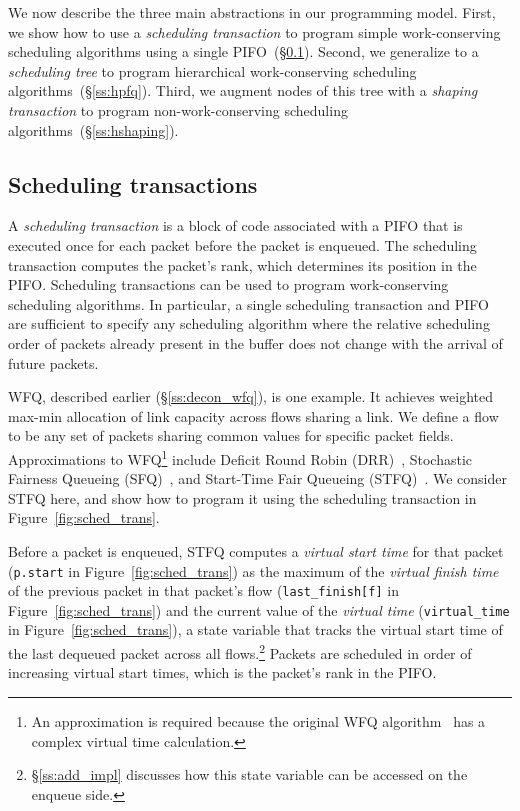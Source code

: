 We now describe the three main abstractions in our programming model. First, we
show how to use a {\em scheduling transaction} to program simple
work-conserving scheduling algorithms using a single PIFO~(\S\ref{ss:wfq}).
Second, we generalize to a {\em scheduling tree} to program hierarchical
work-conserving scheduling algorithms~(\S\ref{ss:hpfq}). Third, we augment
nodes of this tree with a {\em shaping transaction} to program
non-work-conserving scheduling algorithms~(\S\ref{ss:hshaping}).

\subsection{Scheduling transactions}
\label{ss:wfq}

A {\em scheduling transaction} is a block of code associated with a PIFO that
is executed once for each packet before the packet is enqueued. The scheduling
transaction computes the packet's rank, which determines its position in the
PIFO. Scheduling transactions can be used to program work-conserving scheduling
algorithms. In particular, a single scheduling transaction and PIFO are
sufficient to specify any scheduling algorithm where the relative scheduling
order of packets already present in the buffer does not change with the arrival
of future packets.

WFQ, described earlier (\S\ref{ss:decon_wfq}), is one example. It achieves
weighted max-min allocation of link capacity across flows sharing a link. We
define a flow to be any set of packets sharing common values for specific
packet fields.  Approximations to WFQ\footnote{An approximation is required
because the original WFQ algorithm~\cite{wfq} has a complex virtual time
calculation.} include Deficit Round Robin (DRR)~\cite{drr}, Stochastic Fairness
Queueing (SFQ)~\cite{sfq}, and Start-Time Fair Queueing (STFQ)~\cite{stfq}. We
consider STFQ here, and show how to program it using the scheduling transaction
in Figure~\ref{fig:sched_trans}.

Before a packet is enqueued, STFQ computes a {\em virtual start time} for that
packet (\texttt{p.start} in Figure~\ref{fig:sched_trans}) as the maximum of the
{\em virtual finish time} of the previous packet in that packet's flow
(\texttt{last\_finish[f]} in Figure~\ref{fig:sched_trans}) and the current
value of the {\em virtual time} (\texttt{virtual\_time} in
Figure~\ref{fig:sched_trans}), a state variable that tracks the virtual start
time of the last dequeued packet across all flows.\footnote{\S\ref{ss:add_impl}
discusses how this state variable can be accessed on the enqueue side.} Packets
are scheduled in order of increasing virtual start times, which is the packet's
rank in the PIFO.

